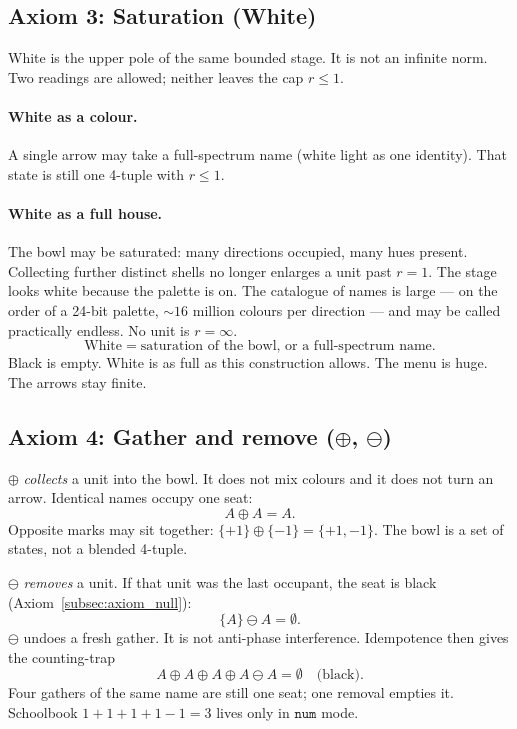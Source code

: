 \documentclass[12pt, a4paper]{article}
\begin{document}
\subsection{Axiom 3: Saturation (White)}
\label{subsec:axiom_white}
White is the upper pole of the same bounded stage. It is not an infinite
norm. Two readings are allowed; neither leaves the cap $r\le 1$.

\paragraph{White as a colour.}
A single arrow may take a full-spectrum name (white light as one
identity). That state is still one 4-tuple with $r\le 1$.

\paragraph{White as a full house.}
The bowl may be saturated: many directions occupied, many hues present.
Collecting further distinct shells no longer enlarges a unit past
$r=1$. The stage looks white because the palette is on. The catalogue
of names is large --- on the order of a 24-bit palette,
$\sim 16$ million colours per direction --- and may be called
practically endless. No unit is $r=\infty$.
\begin{equation}
    \text{White} \;=\; \text{saturation of the bowl, or a full-spectrum name.}
    \label{eq:white_state}
\end{equation}
Black is empty. White is as full as this construction allows. The
menu is huge. The arrows stay finite.

\subsection{Axiom 4: Gather and remove ($\oplus$, $\ominus$)}
\label{subsec:axiom_idempotence}
$\oplus$ \emph{collects} a unit into the bowl. It does not mix colours
and it does not turn an arrow. Identical names occupy one seat:
\begin{equation}
    A \oplus A = A.
    \label{eq:idempotence_formal}
\end{equation}
Opposite marks may sit together: $\{+1\}\oplus\{-1\}=\{+1,-1\}$.
The bowl is a set of states, not a blended 4-tuple.

$\ominus$ \emph{removes} a unit. If that unit was the last occupant,
the seat is black (Axiom~\ref{subsec:axiom_null}):
\begin{equation}
    \{A\}\ominus A = \emptyset.
    \label{eq:ominus_empty}
\end{equation}
$\ominus$ undoes a fresh gather. It is not anti-phase interference.
Idempotence then gives the counting-trap
\begin{equation}
    A \oplus A \oplus A \oplus A \ominus A = \emptyset
    \quad\text{(black)}.
    \label{eq:four_a_ominus}
\end{equation}
Four gathers of the same name are still one seat; one removal empties
it. Schoolbook $1+1+1+1-1=3$ lives only in $\mathtt{num}$ mode.
\end{document}
